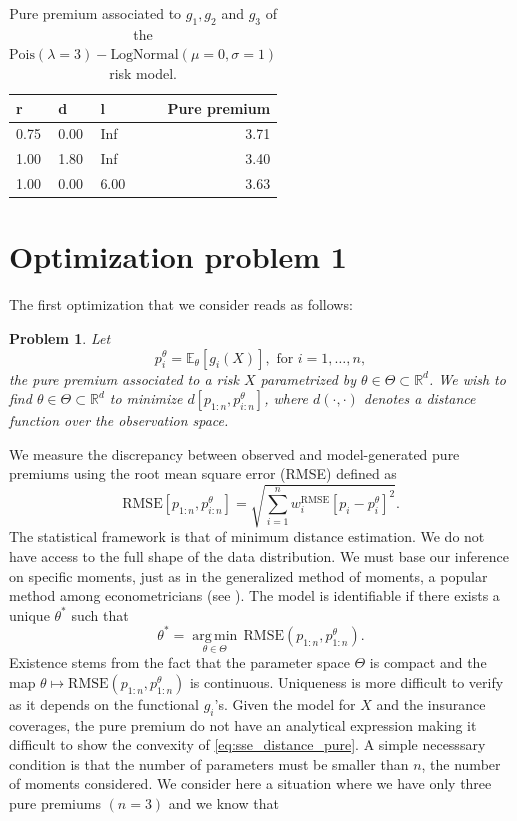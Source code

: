 \documentclass[10pt]{article}
\newtheorem{pb}{Problem}
\DeclareMathOperator*{\argmin}{arg\,min}
\begin{document}
\begin{table}[ht]
\centering
\begin{tabular}{llllr}
  \toprule
r & d & l &\phantom{abc}& Pure premium \\ 
  \midrule
0.75 & 0.00 & Inf && 3.71 \\ 
  1.00 & 1.80 & Inf && 3.40 \\ 
  1.00 & 0.00 & 6.00 && 3.63 \\ 
   \bottomrule
\end{tabular}
\caption{Pure premium associated to $g_1, g_2$ and $g_3$ of the $\text{Pois}(\lambda = 3)-\text{LogNormal}(\mu =0 , \sigma = 1)$ risk model.}
\label{tab:true_pure_premium}
\end{table}


\section{Optimization problem 1}\label{sec:problem1}
The first optimization that we consider reads as follows:
\begin{pb}\label{pb:optimization_problem_simple}
Let 
$$
p_i^\theta =\mathbb{E}_\theta\left[g_{i}(X)\right],\text{ for }i = 1,\ldots, n,
$$
the pure premium associated to a risk $X$ parametrized by $\theta\in \Theta\subset\mathbb{R}^d$. We wish to find $\theta\in \Theta\subset\mathbb{R}^d$ to minimize \(d\left[p_{1:n}, p_{i:n}^\theta\right]\), where $d(\cdot, \cdot)$ denotes a distance function over the observation space.
\end{pb}
We measure the discrepancy between observed and model-generated pure premiums using the root mean square error (RMSE) defined as
\begin{equation}\label{eq:sse_distance_pure}
\text{RMSE}\left[p_{1:n}, p^\theta_{i:n}\right] = \sqrt{\sum_{i=1}^nw^{\text{RMSE}}_i [p_i - p_i^\theta]^2}.
\end{equation}
The statistical framework is that of minimum distance estimation. We do not have access to the full shape of the data distribution. We must base our inference on specific moments, just as in the generalized method of moments, a popular method among econometricians (see \citet{Hansen1982}). The model is identifiable if there exists a unique $\theta^\ast$ such that 
\begin{equation}\label{eq:optimization_knowing_pure_premium}
\theta^\ast  = \underset{\theta\in \Theta}{\argmin}\,\text{RMSE}(p_{1:n}, p_{1:n}^\theta).
\end{equation}
Existence stems from the fact that the parameter space $\Theta$ is compact and the map $\theta\mapsto\text{RMSE}(p_{1:n}, p_{1:n}^\theta)$ is continuous. Uniqueness is more difficult to verify as it depends on the functional $g_i$'s. Given the model for $X$ and the insurance coverages, the pure premium do not have an analytical expression making it difficult to show the convexity of \eqref{eq:sse_distance_pure}. A simple necesssary condition is that the number of parameters must be smaller than $n$, the number of moments considered. We consider here a situation where we have only three pure premiums $(n=3)$ and we know that 
\end{document}
